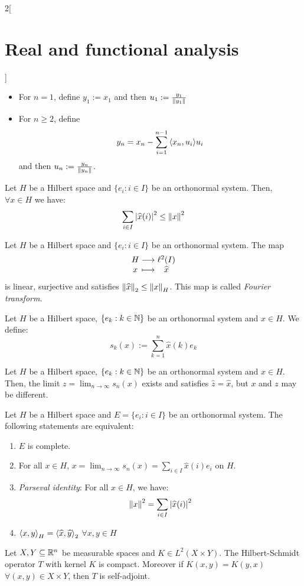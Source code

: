 \documentclass[../../../main_math.tex]{subfiles}
\begin{document}
\begin{multicols}{2}[\section{Real and functional analysis}]
\begin{proposition}
    \begin{itemize}
      \item For $n = 1$, define $y_1:=x_1$ and then $u_1:=\frac{y_1}{\left\|y_1\right\|}$
      \item For $n\geq 2$, define $$y_n=x_n-\sum_{i=1}^{n-1}{\left\langle x_n,u_i\right\rangle}u_i$$
            and then $u_n:=\frac{y_n}{\left\|y_n\right\|}$.
    \end{itemize}
  \end{proposition}
  \begin{theorem}
    Let $H$ be a Hilbert space and $\{e_i:i\in I\}$ be an orthonormal system. Then, $\forall x\in H$ we have: $$\sum_{i\in I}\abs{\widehat{x}(i)}^2\leq\left\|x\right\|^2$$
  \end{theorem}
  \begin{lemma}
    Let $H$ be a Hilbert space and $\{e_i:i\in I\}$ be an orthonormal system. The map $$\function{}{H}{\ell^2(I)}{x}{\widehat{x}}$$ is linear, surjective and satisfies $\left\|\widehat{x}\right\|_2\leq\left\|x\right\|_H$. This map is called \emph{Fourier transform}.
  \end{lemma}
  \begin{definition}
    Let $H$ be a Hilbert space, $\{e_k:k\in\mathbb{N}\}$ be an orthonormal system and $x\in H$. We define: $$s_k(x):=\sum_{k=1}^n\widehat{x}(k)e_k$$
  \end{definition}
  \begin{lemma}
    Let $H$ be a Hilbert space, $\{e_k:k\in\mathbb{N}\}$ be an orthonormal system and $x\in H$. Then, the limit $\displaystyle z = \lim_{n\to\infty} s_n(x)$ exists and satisfies $\widehat{z}=\widehat{x}$, but $x$ and $z$ may be different.
  \end{lemma}
  \begin{theorem}
    Let $H$ be a Hilbert space and $E=\{e_i:i\in I\}$ be an orthonormal system. The following statements are equivalent:
    \begin{enumerate}
      \item $E$ is complete.
      \item For all $x\in H$, $\displaystyle x=\lim_{n\to\infty} s_n(x)=\sum_{i\in I} \widehat{x}(i)e_i$ on $H$.
      \item \emph{Parseval identity}: For all $x\in H$, we have: $$\left\|x\right\|^2=\sum_{i\in I}\abs{\widehat{x}(i)}^2$$
      \item ${\left\langle x,y\right\rangle}_H={\left\langle\widehat{x},\widehat{y}\right\rangle}_2$ $\forall x,y\in H$
    \end{enumerate}
  \end{theorem}
  \begin{proposition}
    Let $X,Y\subseteq \mathbb{R}^n$ be measurable spaces and $K\in L^2(X\times Y)$. The Hilbert-Schmidt operator $T$ with kernel $K$ is compact. Moreover if $K(x,y)=K(y,x)$ $\forall (x,y)\in X\times Y$, then $T$ is self-adjoint.
  \end{proposition}

\end{multicols}
\end{document}
